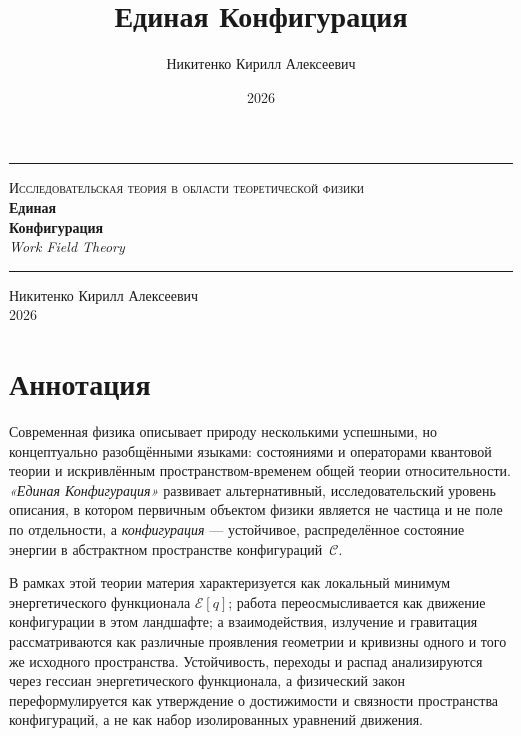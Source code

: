 \documentclass[11pt,oneside]{book}
\title{Единая Конфигурация}
\author{Никитенко Кирилл Алексеевич}
\date{2026}
\begin{document}
\begin{titlepage}
\centering
\vspace*{2.2cm}

{\color{rule}\rule{0.55\textwidth}{0.6pt}}

\vspace{1.6cm}
{\Large\scshape\color{inkblue} Исследовательская теория в области теоретической физики}\\[0.8cm]

{\fontsize{30}{34}\selectfont\bfseries\color{inkblue} Единая\\[0.15cm] Конфигурация}\\[0.6cm]

{\Large\itshape Work Field Theory}

\vspace{1.6cm}
{\color{rule}\rule{0.55\textwidth}{0.6pt}}

\vfill

{\large Никитенко Кирилл Алексеевич}\\[0.3cm]
{\large 2026}

\vspace{1.2cm}
\end{titlepage}

\frontmatter

\chapter*{Аннотация}

Современная физика описывает природу несколькими успешными, но концептуально разобщёнными языками: состояниями и операторами квантовой теории и искривлённым пространством-временем общей теории относительности. \emph{«Единая Конфигурация»} развивает альтернативный, исследовательский уровень описания, в котором первичным объектом физики является не частица и не поле по отдельности, а \emph{конфигурация} — устойчивое, распределённое состояние энергии в абстрактном пространстве конфигураций~$\mathcal{C}$.

В рамках этой теории материя характеризуется как локальный минимум энергетического функционала $\mathcal{E}[q]$; работа переосмысливается как движение конфигурации в этом ландшафте; а взаимодействия, излучение и гравитация рассматриваются как различные проявления геометрии и кривизны одного и того же исходного пространства. Устойчивость, переходы и распад анализируются через гессиан энергетического функционала, а физический закон переформулируется как утверждение о достижимости и связности пространства конфигураций, а не как набор изолированных уравнений движения.
\end{document}
